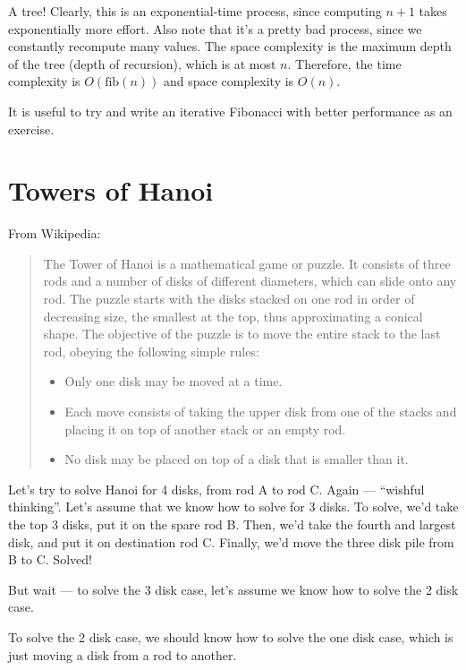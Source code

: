\documentclass[9pt]{report}
\begin{document}
A tree! Clearly, this is an exponential-time process, since
computing \(n+1\) takes exponentially more effort. Also note that
it's a pretty bad process, since we constantly recompute many
values. The space complexity is the maximum depth of the tree
(depth of recursion), which is at most \(n\). Therefore, the time
complexity is \(O(\mathrm{fib}(n))\) and space complexity is \(O(n)\).

It is useful to try and write an iterative Fibonacci with better
performance as an exercise.

\section{Towers of Hanoi}
\label{sec:org929d9f0}

From Wikipedia:

\begin{quote}
The Tower of Hanoi is a mathematical game or puzzle. It consists of
three rods and a number of disks of different diameters, which can
slide onto any rod. The puzzle starts with the disks stacked on one
rod in order of decreasing size, the smallest at the top, thus
approximating a conical shape. The objective of the puzzle is to
move the entire stack to the last rod, obeying the following simple
rules:

\begin{itemize}
\item Only one disk may be moved at a time.
\item Each move consists of taking the upper disk from one of the
stacks and placing it on top of another stack or an empty rod.
\item No disk may be placed on top of a disk that is smaller than it.
\end{itemize}
\end{quote}

Let's try to solve Hanoi for 4 disks, from rod A to rod C. Again
--- ``wishful thinking''. Let's assume that we know how to solve for
3 disks. To solve, we'd take the top 3 disks, put it on the spare
rod B. Then, we'd take the fourth and largest disk, and put it on
destination rod C. Finally, we'd move the three disk pile from B
to C. Solved!

But wait --- to solve the 3 disk case, let's assume we know how to
solve the 2 disk case.

To solve the 2 disk case, we should know how
to solve the one disk case, which is just moving a disk from a rod
to another.
\end{document}
